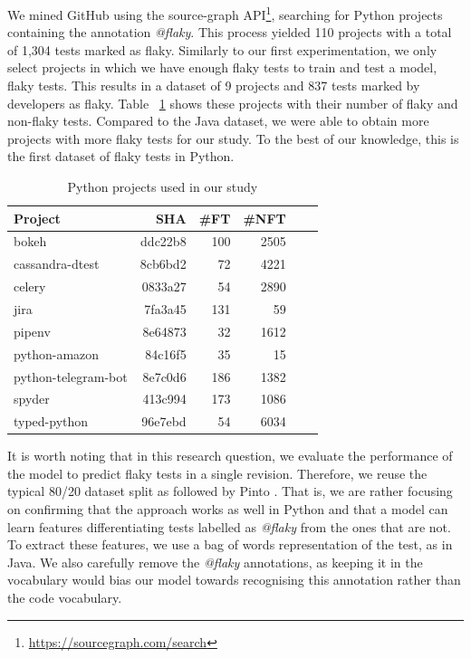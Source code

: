 We mined GitHub using the source-graph API\footnote{\url{https://sourcegraph.com/search}}, searching for Python projects containing the annotation \emph{@flaky}. 
This process yielded 110 projects with a total of 1,304 tests marked as flaky. 
Similarly to our first experimentation, we only select projects in which we have enough flaky tests to train and test a model,  flaky tests.
This results in a dataset of 9 projects and 837 tests marked by developers as flaky.
Table ~\ref{pythonInfo} shows these projects with their number of flaky and non-flaky tests. 
Compared to the Java dataset, we were able to obtain more projects with more flaky tests for our study.
To the best of our knowledge, this is the first dataset of flaky tests in Python.
\begin{table}
\centering
\vspace{1.0em}
\caption{Python projects used in our study}
\label{pythonInfo}
 \begin{tabular}{l|r r r r r} 
 \hline
 \textbf{Project} & \textbf{SHA} & \textbf{\#FT }& \textbf{\#NFT}\\ [0.25ex]
 \hline
 bokeh & ddc22b8 & 100 & 2505 \\
 cassandra-dtest & 8cb6bd2 & 72 & 4221 \\
 celery & 0833a27 & 54 & 2890 \\
 jira & 7fa3a45 & 131 & 59 \\
 pipenv & 8e64873 & 32 & 1612 \\
 python-amazon & 84c16f5 & 35 & 15 \\
 python-telegram-bot & 8e7c0d6 & 186 & 1382 \\
 spyder & 413c994 & 173 & 1086 \\
 typed-python & 96e7ebd & 54 & 6034 \\ 
 \hline
\end{tabular}
\vspace{1.0em}
\end{table}

It is worth noting that in this research question, we evaluate the performance of the model to predict flaky tests in a single revision. Therefore, we reuse the typical 80/20 dataset split as followed by Pinto \etal.  
That is, we are rather focusing on confirming that the approach works as well in Python and that a model can learn features differentiating tests labelled as \emph{@flaky} from the ones that are not. 
To extract these features, we use a bag of words representation of the test, as in Java. 
We also carefully remove the \emph{@flaky} annotations, as keeping it in the vocabulary would bias our model towards recognising this annotation rather than the code vocabulary.


